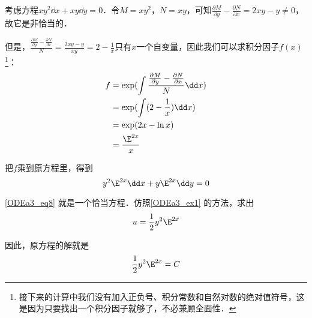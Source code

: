 \begin{example}{}
考虑方程$xy^2\dd x+xy\dd y=0$．令$M=xy^2$，$N=xy$，可知$\frac{\partial M}{\partial y}-\frac{\partial N}{\partial x}=2xy-y\not=0$，故它是非恰当的．

但是，$\frac{\frac{\partial M}{\partial y}-\frac{\partial N}{\partial x}}{N}=\frac{2xy-y}{xy}=2-\frac{1}{x}$只有$x$一个自变量，因此我们可以求积分因子$f(x)$\footnote{接下来的计算中我们没有加入正负号、积分常数和自然对数的绝对值符号，这是因为只要找出一个积分因子就够了，不必兼顾全面性．}：
\begin{equation}
\begin{aligned}
f&=\exp(\int \frac{\frac{\partial M}{\partial y}-\frac{\partial N}{\partial x}}{N}\dd x)\\
&=\exp(\int(2-\frac{1}{x})\dd x)\\
&=\exp(2x-\ln x)\\
&=\frac{\E^{2x}}{x}
\end{aligned}
\end{equation}

把$f$乘到原方程里，得到
\begin{equation}\label{ODEa3_eq8}
y^2\E^{2x}\dd x+y\E^{2x}\dd y=0
\end{equation}

\autoref{ODEa3_eq8} 就是一个恰当方程．仿照\autoref{ODEa3_ex1} 的方法，求出
\begin{equation}
u=\frac{1}{2}y^2\E^{2x}
\end{equation}

因此，原方程的解就是
\begin{equation}
\frac{1}{2}y^2\E^{2x}=C
\end{equation}



\end{example}





